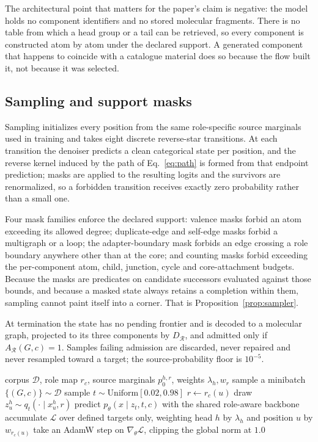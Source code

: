 \documentclass{article}
\newcommand{\decomp}{\ensuremath{D_{\mathcal{R}}}}
\begin{document}
The architectural point that matters for the paper's claim is negative: the model holds no component
identifiers and no stored molecular fragments. There is no table from which a head group or a tail
can be retrieved, so every component is constructed atom by atom under the declared support. A
generated component that happens to coincide with a catalogue material does so because the flow built
it, not because it was selected.

\subsection{Sampling and support masks}
\label{app:sampling}
Sampling initializes every position from the same role-specific source marginals used in training and
takes eight discrete reverse-star transitions. At each transition the denoiser predicts a clean
categorical state per position, and the reverse kernel induced by the path of Eq.~\eqref{eq:path} is
formed from that endpoint prediction; masks are applied to the resulting logits and the survivors are
renormalized, so a forbidden transition receives exactly zero probability rather than a small one.

Four mask families enforce the declared support: valence masks forbid an atom exceeding its allowed
degree; duplicate-edge and self-edge masks forbid a multigraph or a loop; the adapter-boundary mask
forbids an edge crossing a role boundary anywhere other than at the core; and counting masks forbid
exceeding the per-component atom, child, junction, cycle and core-attachment budgets. Because the
masks are predicates on candidate successors evaluated against those bounds, and because a masked
state always retains a completion within them, sampling cannot paint itself into a corner. That is
Proposition~\ref{prop:sampler}.

At termination the state has no pending frontier and is decoded to a molecular graph, projected to its
three components by \decomp{}, and admitted only if $A_{\mathcal{R}}(G,c) = 1$. Samples failing
admission are discarded, never repaired and never resampled toward a target; the source-probability
floor is $10^{-5}$.

\begin{algorithm}[h]
\caption{Training FORGE. One step; role-balanced endpoint prediction.}
\label{alg:train}
\begin{algorithmic}[1]
\REQUIRE corpus $\mathcal{D}$, role map $r_c$, source marginals $p_0^{h,r}$, weights $\lambda_h, w_r$
\STATE sample a minibatch $\{(G, c)\} \sim \mathcal{D}$
\STATE sample $t \sim \mathrm{Uniform}[0.02, 0.98]$
  \STATE $r \leftarrow r_c(u)$
  \STATE draw $z_u^h \sim q_t(\cdot \mid x_u^h, r)$ 
\ENDFOR
\STATE predict $p_\theta(x \mid z_t, t, c)$ with the shared role-aware backbone
\STATE accumulate $\mathcal{L}$ over defined targets only, weighting head $h$ by $\lambda_h$ and position $u$ by $w_{r_c(u)}$
\STATE take an AdamW step on $\nabla_\theta \mathcal{L}$, clipping the global norm at $1.0$
\end{algorithmic}
\end{algorithm}
\end{document}
